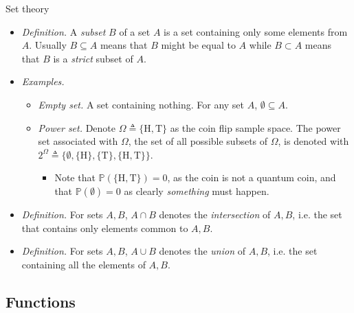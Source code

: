 \documentclass{beamer}
\begin{document}
\begin{frame}{Set theory}
    \begin{itemize}
        \item
        \textit{Definition.} A \textit{subset} $ B $ of a set $ A $ is a set
        containing only some elements from $ A $. Usually $ B \subseteq A $
        means that $ B $ might be equal to $ A $ while $ B \subset A $ means
        that $ B $ is a \textit{strict} subset of $ A $.

        \item
        \textit{Examples.}
        \begin{itemize}
            \item
            \textit{Empty set.} A set containing nothing. For any set $ A $,
            $ \emptyset \subseteq A $.

            \item
            \textit{Power set.} Denote $ \Omega \triangleq \{\text{H},
            \text{T}\} $ as the coin flip sample space. The power set
            associated with $ \Omega $, the set of all possible subsets of
            $ \Omega $, is denoted with $ 2^\Omega \triangleq \{\emptyset,
            \{\text{H}\}, \{\text{T}\}, \{\text{H}, \text{T}\}\} $.
            \begin{itemize}
                \item
                Note that $ \mathbb{P}(\{\text{H}, \text{T}\}) = 0 $, as the
                coin is not a quantum coin, and that $ \mathbb{P}(\emptyset)
                = 0 $ as clearly \textit{something} must happen.
            \end{itemize}
        \end{itemize}

        \item
        \textit{Definition.} For sets $ A, B $, $ A \cap B $ denotes the 
        \textit{intersection} of $ A, B $, i.e. the set that contains only
        elements common to $ A, B $.

        \item
        \textit{Definition.} For sets $ A, B $, $ A \cup B $ denotes the
        \textit{union} of $ A, B $, i.e. the set containing all the elements
        of $ A, B $.
    \end{itemize}
\end{frame}

\subsection{Functions}
\end{document}
